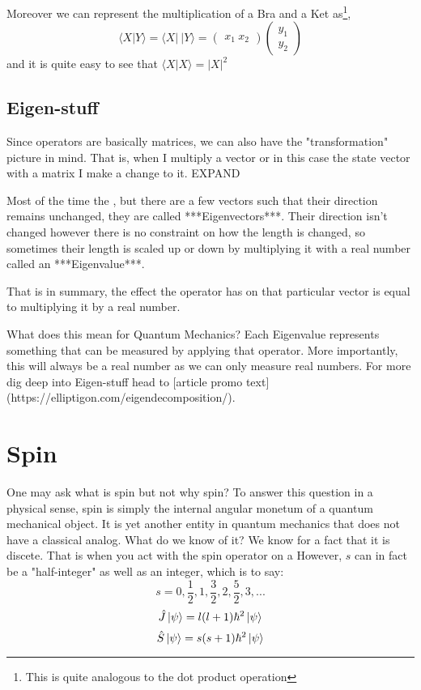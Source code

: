 \documentclass[]{article}
\begin{document}
Moreover we can represent the multiplication of a Bra and a Ket as\footnote{This is quite analogous to the dot product operation},
$$\langle X|Y \rangle = \langle X | \  |Y\rangle = \begin{pmatrix}
x_1 \ x_2
\end{pmatrix} \begin{pmatrix}
y_1 \\
y_2
\end{pmatrix}$$
and it is quite easy to see that
$\langle X | X \rangle = |X|^2$

\subsection{Eigen-stuff}

Since operators are basically matrices, we can also have the "transformation" picture in mind. That is, when I multiply a vector or in this case the state vector with a matrix I make a change to it. EXPAND

Most of the time the , but there are a few vectors such that their direction remains unchanged, they are called ***Eigenvectors***. Their direction isn't changed however there is no constraint on how the length is changed, so sometimes their length is scaled up or down by multiplying it with a real number called an ***Eigenvalue***. 


That is in summary, the effect the operator has on that particular vector is equal to multiplying it by a real number.


What does this mean for Quantum Mechanics? Each Eigenvalue represents something that can be measured by applying that operator. More importantly, this will always be a real number as we can only measure real numbers. For more dig deep into Eigen-stuff head to [article promo text](https://elliptigon.com/eigendecomposition/).

\section{Spin}
One may ask what is spin but not why spin? To answer this question in a physical sense, spin is simply the internal angular monetum of a quantum mechanical object. It is yet another entity in quantum mechanics that does not have a classical analog. What do we know of it? We know for a fact that it is discete. That is when you act with the spin operator on a 
However, $s$ can in fact be a "half-integer" as well as an integer, which is to say:
$$s = 0, \frac{1}{2}, 1, \frac{3}{2}, 2, \frac{5}{2}, 3, ...$$
$$\hat{J} \ket{\psi} = l(l+1)\hbar^{2}\ket{\psi}$$
$$\hat{S} \ket{\psi} = s(s+1)\hbar^{2}\ket{\psi}$$
\end{document}
